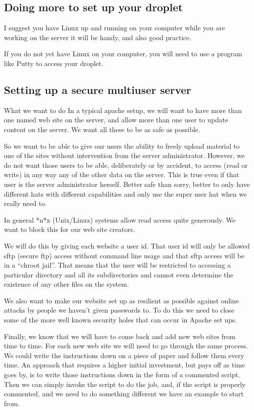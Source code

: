 \documentclass[12pt, a4paper]{article}
\begin{document}
\subsection*{Doing more to set up your droplet}


I suggest you have Linux up and running on your computer while you are working on the server  it will be handy, and also good practice.

If you do not yet have Linux on your computer, you will need to use a program like Putty to access your droplet.

\subsection*{Setting up a secure  multiuser server}

What we want to do
In a typical apache setup, we will want to have more than one named web site on the server, and allow more than one user to update content on the server. We want all these to be as safe as possible.

So we want to be able to give our users the ability to freely upload material to one of the sites without intervention from the server administrator. However, we do not want those users to be able, deliberately or by accident, to access (read or write) in any way any of the other data on the server. This is true even if that user is the server administrator herself. Better safe than sorry, better to only have different hats with different capabilities and only use the super user hat when we really need to.

In general *n*x (Unix/Linux) systems allow read access quite generously. We want to block this for our web site creators.

We will do this by giving each website a user id. That user id will only be allowed sftp (secure ftp) access without command line usage and that sftp access will be in a “chroot jail”. That means that the user will be restricted to accessing a particular directory and all its subdirectories and cannot even determine the existence of any other files on the system.

We also want to make our website set up as resilient as possible against online attacks by people we haven’t given passwords to. To do this we need to close some of the more well known security holes that can occur in Apache set ups. 

Finally, we know that we will have to come back and add new web sites from time to time. For each new web site we will need to go through the same process. We could write the instructions down on a piece of paper and follow them every time. An approach that requires a higher initial investment, but pays off as time goes by, is to write those instructions down in the form of a commented script. Then we can simply invoke the script to do the job, and, if the script is properly commented, and we need to do something different we have an example to start from.
\end{document}
